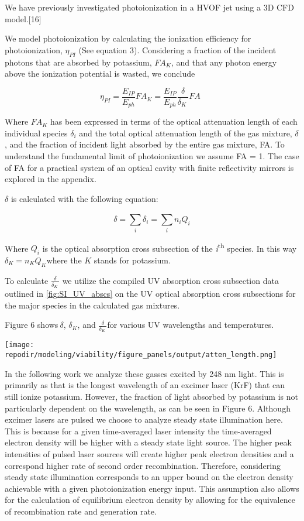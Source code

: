We have previously investigated photoionization in a HVOF jet using a 3D CFD model.{[}16{]}

We model photoionization by calculating the ionization efficiency for photoionization, \(\eta_{PI}\) (See equation 3). Considering a fraction of the incident photons that are absorbed by potassium, \(FA_{K}\), and that any photon energy above the ionization potential is wasted, we conclude

\begin{equation}
\eta_{PI} = \frac{E_{IP}}{E_{ph}}FA_{K} = \frac{E_{IP}}{E_{ph}}\frac{\delta}{\delta_{K}\ }FA\ \ 
\end{equation}

Where \(FA_{K}\) has been expressed in terms of the optical attenuation length of each individual species \(\delta_{i}\) and the total optical attenuation length of the gas mixture, \(\delta\), and the fraction of incident light absorbed by the entire gas mixture, FA. To understand the fundamental limit of photoionization we assume FA = 1. The case of FA for a practical system of an optical cavity with finite reflectivity mirrors is explored in the appendix.

\(\delta\) is calculated with the following equation:

\begin{equation}
\delta = \sum_{i}^{}\delta_{i} = \sum_{i}^{}{n_{i}Q_{i}}
\end{equation}

Where \(Q_{i}\) is the optical absorption cross subsection of the \emph{i}\textsuperscript{th} species. In this way \(\delta_{K} = n_{K}Q_{K}\)where the \(K\) stands for potassium.

To calculate \(\frac{\delta}{\delta_{K}\ }\) we utilize the compiled UV absorption cross subsection data outlined in \ref{fig:SI_UV_abscs} on the UV optical absorption cross subsections for the major species in the calculated gas mixtures.

Figure 6 shows\(\ \delta\), \(\delta_{K}\), and \(\frac{\delta}{\delta_{K}\ }\)for various UV wavelengths and temperatures.

\texttt{[image: \\repodir/modeling/viability/figure\_panels/output/atten\_length.png]}

In the following work we analyze these gasses excited by 248 nm light. This is primarily as that is the longest wavelength of an excimer laser (KrF) that can still ionize potassium. However, the fraction of light absorbed by potassium is not particularly dependent on the wavelength, as can be seen in Figure 6. Although excimer lasers are pulsed we choose to analyze steady state illumination here. This is because for a given time-averaged laser intensity the time-averaged electron density will be higher with a steady state light source. The higher peak intensities of pulsed laser sources will create higher peak electron densities and a correspond higher rate of second order recombination. Therefore, considering steady state illumination corresponds to an upper bound on the electron density achievable with a given photoionization energy input. This assumption also allows for the calculation of equilibrium electron density by allowing for the equivalence of recombination rate and generation rate.

